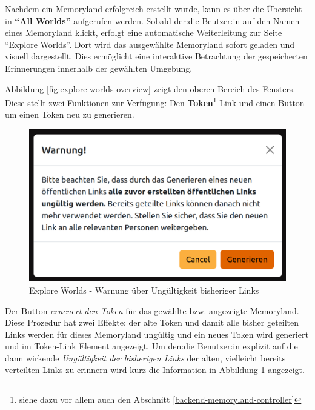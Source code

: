 Nachdem ein Memoryland erfolgreich erstellt wurde, kann es über die Übersicht in \textbf{``All Worlds''} aufgerufen werden. Sobald der:die Beutzer:in auf den Namen eines Memoryland klickt, erfolgt eine automatische Weiterleitung zur Seite ``Explore Worlds''. Dort wird das ausgewählte Memoryland sofort geladen und visuell dargestellt. Dies ermöglicht eine interaktive Betrachtung der gespeicherten Erinnerungen innerhalb der gewählten Umgebung.

Abbildung \ref{fig:explore-worlds-overview} zeigt den oberen Bereich des Fensters. Diese stellt zwei Funktionen zur Verfügung: Den \textbf{Token}\footnote{siehe dazu vor allem auch den Abschnitt \ref{backend-memoryland-controller}}-Link  und einen Button um einen Token neu zu generieren.

\begin{figure} [h t]
    \centering
    \includegraphics[scale=0.35]{pics/explore-worlds-warning.png}
    \caption{Explore Worlds - Warnung über Ungültigkeit bisheriger Links}
    \label{fig:explore-worlds-warning}
\end{figure}

Der Button \emph{erneuert den Token} für das gewählte bzw. angezeigte Memoryland. Diese Prozedur hat zwei Effekte: der alte Token und damit alle bisher geteilten Links werden für dieses Memoryland ungültig und ein neues Token wird generiert und im Token-Link Element angezeigt. Um den:die Benutzer:in explizit auf die dann wirkende \emph{Ungültigkeit der bisherigen Links} der alten, vielleicht bereits verteilten Links zu erinnern wird kurz die Information in Abbildung \ref{fig:explore-worlds-warning} angezeigt.

